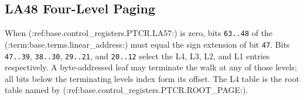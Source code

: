 \subsection{LA48 Four-Level Paging}

When (:ref:base.control_registers.PTCR.LA57:) is zero, bits \texttt{63..48} of the (:term:base.terms.linear_address:) must equal the sign extension of bit
\texttt{47}. Bits \texttt{47..39}, \texttt{38..30}, \texttt{29..21}, and \texttt{20..12} select the L4, L3, L2,
and L1 entries respectively. A byte-addressed leaf may terminate the walk at any of those levels; all bits below
the terminating level\textquotesingle{}s index form its offset. The L4 table is the root table named by (:ref:base.control_registers.PTCR.ROOT_PAGE:).



\clearpage
